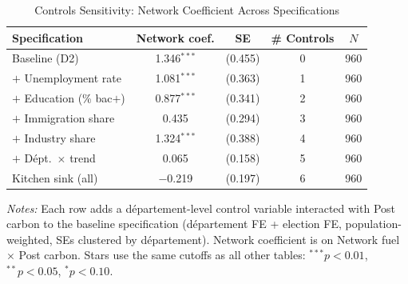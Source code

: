 \begin{table}[!h]
\centering
\caption{Controls Sensitivity: Network Coefficient Across Specifications}
\label{tab:controls}
\centering
\fontsize{10}{12}\selectfont
\begin{threeparttable}
\begin{tabular}[t]{lcccc}
\toprule
Specification & Network coef. & SE & \# Controls & $N$\\
\midrule
Baseline (D2) & 1.346$^{***}$ & (0.455) & 0 & 960\\
$+$ Unemployment rate & 1.081$^{***}$ & (0.363) & 1 & 960\\
$+$ Education (\% bac$+$) & 0.877$^{***}$ & (0.341) & 2 & 960\\
$+$ Immigration share & 0.435 & (0.294) & 3 & 960\\
$+$ Industry share & 1.324$^{***}$ & (0.388) & 4 & 960\\
$+$ D\'{e}pt.~$\times$ trend & 0.065 & (0.158) & 5 & 960\\
Kitchen sink (all) & $-$0.219 & (0.197) & 6 & 960\\
\bottomrule
\end{tabular}
\begin{tablenotes}[flushleft]\footnotesize
\item \textit{Notes:} Each row adds a d\'{e}partement-level control variable interacted with Post carbon to the baseline specification (d\'{e}partement FE + election FE, population-weighted, SEs clustered by d\'{e}partement). Network coefficient is on Network fuel $\times$ Post carbon. Stars use the same cutoffs as all other tables: $^{***}p<0.01$, $^{**}p<0.05$, $^{*}p<0.10$.
\end{tablenotes}
\end{threeparttable}
\end{table}
